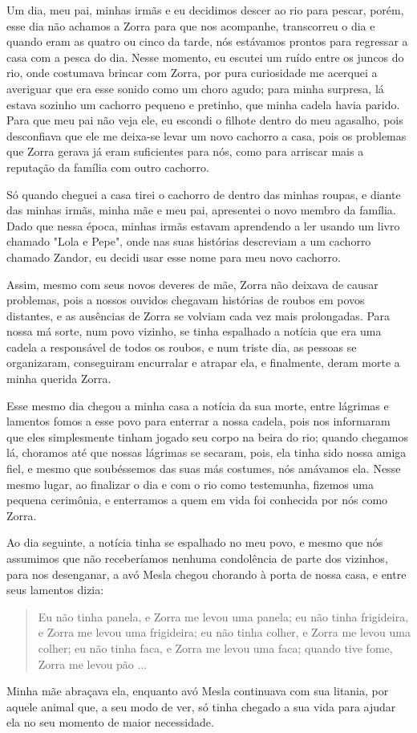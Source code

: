 Um dia, meu pai, minhas irmãs e eu decidimos descer ao rio para pescar, porém, esse dia não achamos a Zorra para que nos acompanhe, transcorreu o dia e quando eram as quatro ou cinco da tarde, nós estávamos prontos para regressar a casa com a pesca do dia. Nesse momento, eu escutei um ruído entre os juncos do rio, onde costumava brincar com Zorra, por pura curiosidade me acerquei a averiguar que era esse sonido como um choro agudo; para minha surpresa, lá estava sozinho um cachorro pequeno e pretinho, que minha cadela havia parido.  
Para que meu pai não veja ele, eu escondi o filhote dentro do meu agasalho, pois desconfiava que ele me deixa-se levar um novo cachorro a casa, pois os problemas que Zorra gerava já eram suficientes para nós, como para arriscar mais a reputação da família com outro cachorro.

Só quando cheguei a casa tirei o cachorro de dentro das minhas roupas, e diante das minhas irmãs, minha mãe e meu pai, apresentei o novo membro da família. Dado que nessa época, minhas irmãs estavam aprendendo a ler usando um livro chamado "Lola e Pepe", onde nas suas histórias descreviam a um cachorro chamado Zandor, eu decidi usar esse nome para meu novo cachorro. 

Assim, mesmo com seus novos deveres de mãe, Zorra não deixava de causar problemas, pois a nossos ouvidos chegavam histórias de roubos em povos distantes, e as ausências de Zorra se volviam cada vez mais prolongadas.
Para nossa má sorte, num povo vizinho, se tinha espalhado a notícia que era uma cadela a responsável de todos os roubos, e num triste dia, as pessoas se organizaram, conseguiram encurralar e atrapar ela, e finalmente, deram morte a minha querida Zorra.

Esse mesmo dia chegou a minha casa a notícia da sua morte, entre lágrimas e lamentos fomos a esse povo para enterrar a nossa cadela, pois nos informaram que eles simplesmente tinham jogado seu corpo na beira do rio; quando chegamos lá, choramos até que nossas lágrimas se secaram, pois, ela tinha sido nossa amiga fiel, e mesmo que soubéssemos das suas más costumes, nós amávamos ela.
Nesse mesmo lugar, ao finalizar o dia e com o rio como testemunha, fizemos uma pequena cerimônia, e enterramos a quem em vida foi conhecida por nós como Zorra.

Ao dia seguinte, a notícia tinha se espalhado no meu povo, e mesmo que nós assumimos que não receberíamos nenhuma condolência de parte dos vizinhos, para nos desenganar, a avó Mesla chegou chorando à porta de nossa casa, e entre seus lamentos dizia:
\begin{quotation}
Eu não tinha panela, e Zorra me levou uma panela; 
eu não tinha frigideira, e Zorra me levou uma frigideira; 
eu não tinha colher, e Zorra me levou uma colher;
eu não tinha faca, e Zorra me levou uma faca;
quando tive fome, Zorra me levou pão ...  
\end{quotation}
Minha mãe abraçava ela, enquanto avó Mesla continuava com sua litania, por aquele animal que, a seu modo de ver, só tinha chegado a sua vida para ajudar ela no seu momento de maior necessidade.
 

